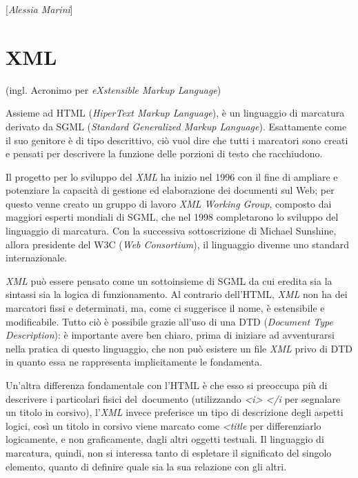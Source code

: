 {\hrulefill 
 
{[}\emph{Alessia Marini}{]}




\chapter{XML}

(ingl. Acronimo per \emph{eXstensible Markup Language})

Assieme ad HTML (\emph{HiperText Markup Language}), è un linguaggio di
marcatura derivato da SGML (\emph{Standard Generalized Markup
Language}). Esattamente come il suo genitore è di tipo descrittivo, ciò
vuol dire che tutti i marcatori sono creati e pensati per descrivere la
funzione delle porzioni di testo che racchiudono.

Il progetto per lo sviluppo del \emph{XML} ha inizio nel 1996 con il
fine di ampliare e potenziare la capacità di gestione ed elaborazione
dei documenti sul Web; per questo venne creato un gruppo di lavoro
\emph{XML Working Group}, composto dai maggiori esperti mondiali di
SGML, che nel 1998 completarono lo sviluppo del linguaggio di marcatura.
Con la successiva sottoscrizione di Michael Sunshine, allora presidente
del W3C (\emph{Web Consortium}), il linguaggio divenne uno standard
internazionale.

\emph{XML} può essere pensato come un sottoinsieme di SGML da cui
eredita sia la sintassi sia la logica di funzionamento. Al contrario
dell'HTML, \emph{XML} non ha dei marcatori fissi e determinati, ma, come
ci suggerisce il nome, è estensibile e modificabile. Tutto ciò è
possibile grazie all'uso di una DTD (\emph{Document Type Description}):
è importante avere ben chiaro, prima di iniziare ad avventurarsi nella
pratica di questo linguaggio, che non può esistere un file \emph{XML}
privo di DTD in quanto essa ne rappresenta implicitamente le fondamenta.

Un'altra differenza fondamentale con l'HTML è che esso si preoccupa più
di descrivere i particolari fisici del~documento (utilizzando
\emph{\textless{}i\textgreater{} \textless{}/i} per
segnalare un titolo in corsivo), l'\emph{XML} invece preferisce un tipo
di descrizione degli aspetti logici, così un titolo in corsivo viene
marcato come \emph{\textless{}title} per differenziarlo
logicamente, e non graficamente, dagli altri oggetti testuali. Il
linguaggio di marcatura, quindi, non si interessa tanto di espletare il
significato del singolo elemento, quanto di definire quale sia la sua
relazione con gli altri.

}
